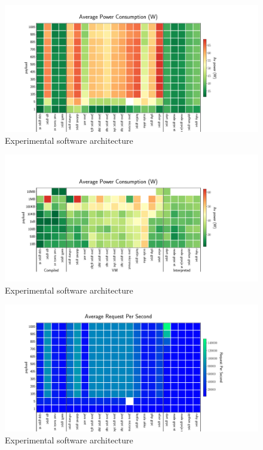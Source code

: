\begin{figure}[!hbt]
    \begin{center}
        \includegraphics[width=1.2\linewidth]{imgs/power_consumption_clients}
    \end{center}
    \caption{Experimental software architecture}\label{fig:power_consumption_clients}
\end{figure}


\begin{figure}[!hbt]
    \begin{center}
        \includegraphics[width=1.2\linewidth]{imgs/power_consumption_payload}
    \end{center}
    \caption{Experimental software architecture}\label{fig:power_consumption_payload}
\end{figure}

\begin{figure}[!hbt]
    \begin{center}
        \includegraphics[width=1.2\linewidth]{imgs/rps_clients}
    \end{center}
    \caption{Experimental software architecture}\label{fig:rps_clients}
\end{figure}

